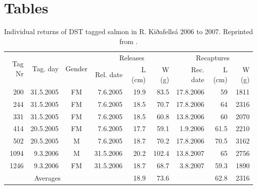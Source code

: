 
\clearpage
\section*{Tables}

\begin{table}[ht]
  \centering
  \caption{Individual returns of DST tagged salmon in R. Kiðafellsá 2006 to 2007. Reprinted from \citet{Gudjonsson2015}.}
  \begin{tabular}{rrcrrrrrr}
    \hline
     \multirow{2}{*}{Tag Nr} & \multirow{2}{*}{Tag. day} & \multirow{2}{*}{Gender} &  \multicolumn{3}{c}{Releases}&\multicolumn{3}{c}{Recaptures}\\
     &&& Rel. date & L (cm) & W (g) & Rec. date & L (cm)&W (g)  \\
    \hline
     200 & 31.5.2005 & FM &  7.6.2005 & 19.9 & 83.5& 17.8.2006 &59  & 1811 \\
     244 & 31.5.2005 & FM &  7.6.2005 & 18.5 & 70.7& 17.8.2006 &64  & 2316 \\
     331 & 31.5.2005 & FM &  7.6.2005 & 18.5 & 60.8& 13.8.2006 &60 & 2070 \\
     414 & 20.5.2005 & FM &  7.6.2005 & 17.7 & 59.1&  1.9.2006 &61.5& 2210 \\
     502 & 20.5.2005 &  M &  7.6.2005 & 18.7 & 70.2& 17.8.2006 &70.5& 3162 \\
    1094 &  9.3.2006 &  M & 31.5.2006 & 20.2 &102.4& 13.8.2007 &65  & 2756 \\
    1246 &  9.3.2006 & FM & 31.5.2006 & 18.7 & 68.7& 3.8.2007 &59.3& 1890 \\
    \hline
    \multicolumn{3}{c}{Averages}&&18.9&73.6&&62.8&2316\\
    \hline
  \end{tabular}
  \label{tab:WandL}
\end{table}


